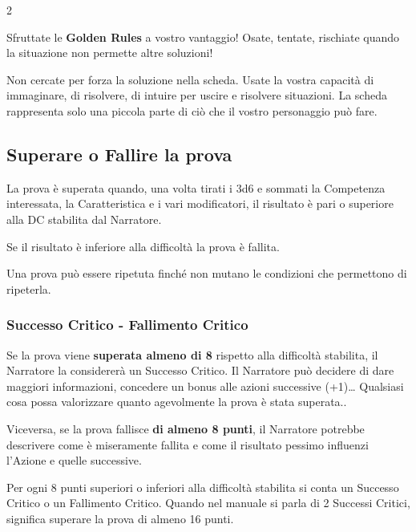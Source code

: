 \begin{multicols}{2}
\begin{itemize}[leftmargin=*]
\end{itemize}

Sfruttate le \textbf{Golden Rules} a vostro vantaggio! Osate, tentate, rischiate quando la situazione non permette altre soluzioni!

\begin{giocatore}{
Non cercate per forza la soluzione nella scheda. Usate la vostra capacità di immaginare, di risolvere, di intuire per uscire e risolvere situazioni. La scheda rappresenta solo una piccola parte di ciò che il vostro personaggio può fare.
}\end{giocatore}

\subsection{Superare o Fallire la prova}\label{superareofallirelaprova}

La prova è superata quando, una volta tirati i 3d6 e sommati la Competenza interessata, la Caratteristica e i vari modificatori, il risultato è pari o superiore alla DC stabilita dal Narratore.

Se il risultato è inferiore alla difficoltà la prova è fallita.

Una prova può essere ripetuta finché non mutano le condizioni che permettono di ripeterla.

\subsubsection{Successo Critico - Fallimento Critico}

Se la prova viene \textbf{superata almeno di 8} rispetto alla difficoltà stabilita, il Narratore la considererà un Successo Critico.
Il Narratore può decidere di dare maggiori informazioni, concedere un bonus alle azioni successive (+1)… Qualsiasi cosa possa valorizzare quanto agevolmente la prova è stata superata..

Viceversa, se la prova fallisce \textbf{di almeno 8 punti}, il Narratore potrebbe descrivere come è miseramente fallita e come il risultato pessimo influenzi l'Azione e quelle successive.

Per ogni 8 punti superiori o inferiori alla difficoltà stabilita si conta un Successo Critico o un Fallimento Critico. Quando nel manuale si parla di 2 Successi Critici, significa superare la prova di almeno 16 punti.


\end{multicols}
